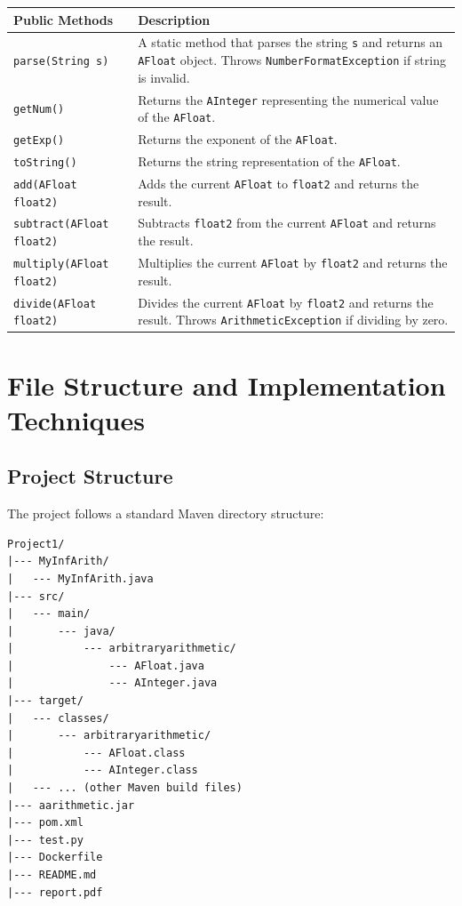 \documentclass[a4paper,12pt]{article}
\begin{document}
\begin{center}
\begin{tabular}{|l|p{8cm}|}
\hline
\textbf{Public Methods} & \textbf{Description} \\
\hline
\texttt{parse(String s)} & A static method that parses the string \texttt{s} and returns an \texttt{AFloat} object. Throws \texttt{NumberFormatException} if string is invalid.\\
\hline
\texttt{getNum()} & Returns the \texttt{AInteger} representing the numerical value of the \texttt{AFloat}. \\
\hline
\texttt{getExp()} & Returns the exponent of the \texttt{AFloat}. \\
\hline
\texttt{toString()} & Returns the string representation of the \texttt{AFloat}. \\
\hline
\texttt{add(AFloat float2)} & Adds the current \texttt{AFloat} to \texttt{float2} and returns the result. \\
\hline
\texttt{subtract(AFloat float2)} & Subtracts \texttt{float2} from the current \texttt{AFloat} and returns the result. \\
\hline
\texttt{multiply(AFloat float2)} & Multiplies the current \texttt{AFloat} by \texttt{float2} and returns the result. \\
\hline
\texttt{divide(AFloat float2)} & Divides the current \texttt{AFloat} by \texttt{float2} and returns the result. Throws \texttt{ArithmeticException} if dividing by zero. \\
\hline
\end{tabular}
\end{center}

\newpage
\section{File Structure and Implementation Techniques}

\subsection{Project Structure}

The project follows a standard Maven directory structure:

\begin{verbatim}
Project1/
|--- MyInfArith/
|   --- MyInfArith.java
|--- src/
|   --- main/
|       --- java/
|           --- arbitraryarithmetic/
|               --- AFloat.java
|               --- AInteger.java
|--- target/
|   --- classes/
|       --- arbitraryarithmetic/
|           --- AFloat.class
|           --- AInteger.class
|   --- ... (other Maven build files)
|--- aarithmetic.jar
|--- pom.xml
|--- test.py
|--- Dockerfile
|--- README.md
|--- report.pdf
\end{verbatim}
\end{document}
